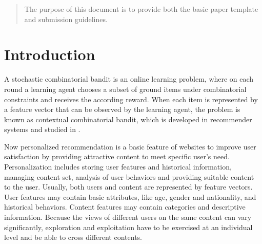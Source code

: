 \documentclass{article}
\begin{document}
 
	
	
\begin{abstract} 
The purpose of this document is to provide both the basic paper template and submission guidelines.
\end{abstract} 
	
\section{Introduction}

A stochastic combinatorial bandit \cite{gai2012combinatorial,chen2013combinatorial} is an online learning problem, where on each round a learning agent chooses a subset of ground items under combinatorial constraints and receives the according reward. When each item is represented by a feature vector that can be observed by the learning agent, the problem is known as contextual combinatorial bandit, which is developed in recommender systems and studied in \cite{qin2014contextual}.

Now personalized recommendation is a basic feature of websites to improve user satisfaction by providing attractive content to meet specific user's need. Personalization includes storing user features and historical information, managing content set, analysis of user behaviors and providing suitable content to the user. Usually, both users and content are represented by feature vectors. User features may contain basic attributes, like age, gender and nationality, and historical behaviors. Content features may contain categories and descriptive information. Because the views of different users on the same content can vary significantly, exploration and exploitation have to be exercised at an individual level and be able to cross different contents.
\end{document}
